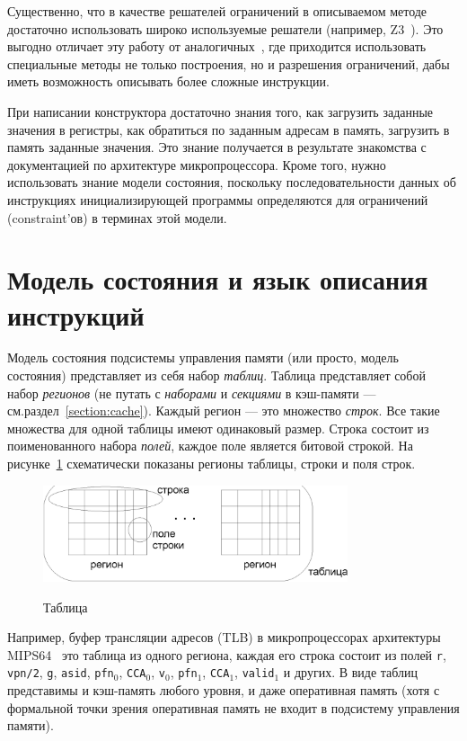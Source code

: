 Существенно, что в качестве решателей ограничений в описываемом методе достаточно использовать широко используемые решатели (например, Z3~\cite{Z3}). Это выгодно отличает эту работу от аналогичных~\cite{GenesysPro}, где приходится использовать специальные методы не только построения, но и разрешения
ограничений, дабы иметь возможность описывать более сложные инструкции.

При написании конструктора достаточно знания того, как загрузить заданные
значения в регистры, как обратиться по заданным адресам в память, загрузить в
память заданные значения. Это знание получается в результате знакомства с
документацией по архитектуре микропроцессора. Кроме того, нужно использовать
знание модели состояния, поскольку последовательности данных об инструкциях
инициализирующей программы определяются для ограничений (constraint'ов) в
терминах этой модели.

\section{Модель состояния и язык описания инструкций}\label{state_model_section}

Модель состояния подсистемы управления памяти (или просто, модель состояния)
представляет из себя набор \emph{таблиц}. Таблица представляет собой набор
\emph{регионов} (не путать с \emph{наборами} и \emph{секциями} в кэш-памяти --- см.раздел~\ref{section:cache}). Каждый регион --- это множество \emph{строк}. Все такие
множества для одной таблицы имеют одинаковый размер. Строка состоит из
поименованного набора \emph{полей}, каждое поле является битовой строкой. На
рисунке~\ref{table_picture} схематически показаны регионы таблицы, строки и поля
строк.

\begin{figure}[h] \center
  \includegraphics[width=0.8\textwidth]{2.theor/table.eps}\\
  \caption{Таблица}\label{table_picture}
\end{figure}

Например, буфер трансляции адресов (TLB) в микропроцессорах архитектуры
MIPS64~\cite{mips64III} это таблица из одного региона, каждая его строка
состоит из полей \texttt{r}, \texttt{vpn/2}, \texttt{g}, \texttt{asid},
\texttt{pfn}$_0$, \texttt{CCA}$_0$, \texttt{v}$_0$, \texttt{pfn}$_1$,
\texttt{CCA}$_1$, \texttt{valid}$_1$ и других. В виде таблиц представимы и
кэш-память любого уровня, и даже оперативная память (хотя с формальной точки зрения оперативная
память не входит в подсистему управления памяти).


